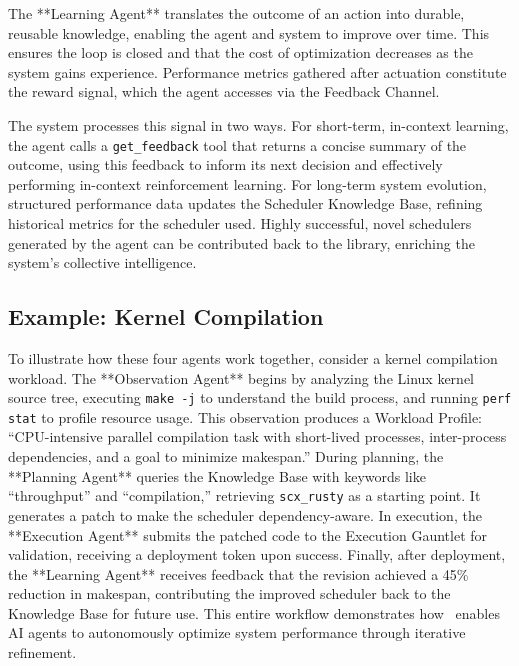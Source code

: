 The **Learning Agent** translates the outcome of an action into durable, reusable knowledge, enabling the agent and system to improve over time. This ensures the loop is closed and that the cost of optimization decreases as the system gains experience. Performance metrics gathered after actuation constitute the reward signal, which the agent accesses via the Feedback Channel.

The system processes this signal in two ways. For short-term, in-context learning, the agent calls a \texttt{get\_feedback} tool that returns a concise summary of the outcome, using this feedback to inform its next decision and effectively performing in-context reinforcement learning. For long-term system evolution, structured performance data updates the Scheduler Knowledge Base, refining historical metrics for the scheduler used. Highly successful, novel schedulers generated by the agent can be contributed back to the library, enriching the system's collective intelligence.


\subsection{Example: Kernel Compilation}

To illustrate how these four agents work together, consider a kernel compilation workload. The **Observation Agent** begins by analyzing the Linux kernel source tree, executing \texttt{make -j} to understand the build process, and running \texttt{perf stat} to profile resource usage. This observation produces a Workload Profile: ``CPU-intensive parallel compilation task with short-lived processes, inter-process dependencies, and a goal to minimize makespan.'' During planning, the **Planning Agent** queries the Knowledge Base with keywords like ``throughput'' and ``compilation,'' retrieving \texttt{scx\_rusty} as a starting point. It generates a patch to make the scheduler dependency-aware. In execution, the **Execution Agent** submits the patched code to the Execution Gauntlet for validation, receiving a deployment token upon success. Finally, after deployment, the **Learning Agent** receives feedback that the revision achieved a 45\% reduction in makespan, contributing the improved scheduler back to the Knowledge Base for future use. This entire workflow demonstrates how \agent\ enables AI agents to autonomously optimize system performance through iterative refinement.


